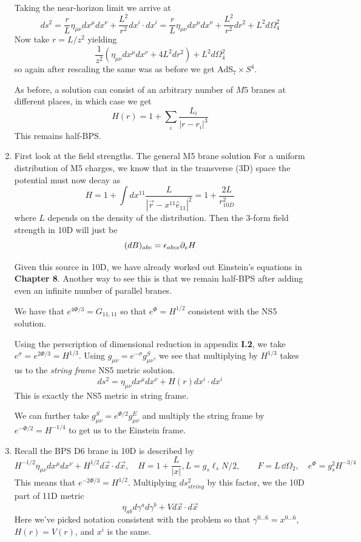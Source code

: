 \documentclass[11pt, class=article, crop=false]{standalone}
\begin{document}
\begin{enumerate}
	Taking the near-horizon limit we arrive at
	\[
		ds^2 = \frac{r}{L}  \eta_{\mu \nu} dx^\mu dx^\nu + \frac{L^2}{r^2} dx^i \cdot dx^i = \frac{r}{L} \eta_{\mu \nu} dx^\mu dx^\nu + \frac{L^2}{r^2} dr^2 + L^2 d\Omega_4^2
	\]
	Now take $r = L/z^2$ yielding 
	\[
		\frac{1}{z^2}  (\eta_{\mu \nu} dx^\mu dx^\nu  + 4 L^2 dr^2) + L^2 d\Omega_4^2
	\]
	so again after rescaling the same was as before we get AdS$_7 \times S^4$.
	
	As before, a solution can consist of an arbitrary number of $M5$ branes at different places, in which case we get
	\[
		H(r) = 1 + \sum_{i} \frac{L_i}{|r-r_i|^3}
	\]
	This remains half-BPS.

	\item First look at the field strengths. The general M5 brane solution 
	 For a uniform distribution of M5 charges, we know that in the transverse (3D) space the potential must now decay as
	\[
		H = 1 + \int dx^{11} \frac{L}{|\vec r - x^{11} \hat e_{11}|^2} = 1 + \frac{2L}{r_{10D}^2}
	\]
	where $L$ depends on the density of the distribution. Then the $3$-form field strength in 10D will just be
	\[
		(dB)_{abc} = \epsilon_{abce} \partial_e H
	\]
	
	 Given this source in 10D, we have already worked out Einstein's equations in \textbf{Chapter 8}. Another way to see this is that we remain half-BPS after adding even an infinite number of parallel branes. 
	
	We have that $e^{4\Phi/3} = G_{11,11}$ so that $e^\Phi = H^{1/2}$ consistent with the NS5 solution. 
	
	Using the perscription of dimensional reduction in appendix \textbf{I.2}, we take $e^{\sigma} = e^{2\Phi/3} = H^{1/3}$. Using $g_{\mu \nu} = e^{-\sigma} g^S_{\mu\nu}$, we see that multiplying by $H^{1/3}$ takes us to the \emph{string frame} NS5 metric solution. 
	\[
		ds^2 = \eta_{\mu \nu} dx^\mu dx^\nu + H(r) dx^i \cdot dx^i
	\]
	This is exactly the NS5 metric in string frame.
	
	We can further take $g^S_{\mu \nu} = e^{\Phi/2} g^E_{\mu \nu}$ and multiply the string frame by $e^{-\Phi/2} = H^{-1/4}$ to get us to the Einstein frame. 
	
	\item Recall the BPS D6 brane in 10D is described by 
	\[
		H^{-1/2} \eta_{\mu \nu} dx^\mu dx^\nu + H^{1/2} d\vec x \cdot d \vec x , \quad H = 1 + \frac{L}{|x|}, L = g_s \ell_s N /2, \qquad F = L \, \dd \Omega_2, \quad e^{\Phi} = g_s^2 H^{-3/4}
	\]
	This means that $e^{-2\Phi/3} = H^{1/2}$. Multiplying $ds^2_{string}$ by this factor, we the 10D part of 11D metric
	\[
		\eta_{ab} d\gamma^a d \gamma^b + V d\vec x \cdot d \vec x
	\]
	Here we've picked notation consistent with the problem so that $\gamma^{0 \dots 6} = x^{0 \dots 6}$, $H(r) = V(r)$, and $x^i$ is the same.
	

\end{enumerate}
\end{document}
